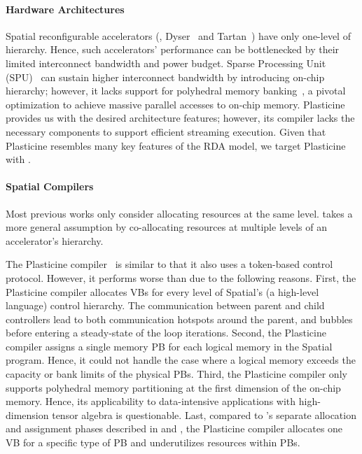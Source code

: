 \paragraph{Hardware Architectures}
Spatial reconfigurable accelerators (\eg, Dyser~\cite{dyser} and Tartan~\cite{tartan}) have only one-level of hierarchy.
Hence, such accelerators' performance can be bottlenecked by their limited interconnect bandwidth and power budget.
Sparse Processing Unit (SPU)~\cite{sparseaccel} can sustain higher interconnect bandwidth by introducing on-chip hierarchy; however, it lacks support for polyhedral memory banking~\cite{poly_cong}, a pivotal optimization to achieve massive parallel accesses to on-chip memory. Plasticine~\cite{plasticine} provides us with the desired architecture features; however, its compiler lacks the necessary components to support efficient streaming execution. Given that Plasticine resembles many key features of the RDA model, we target Plasticine with \name{}.

\paragraph{Spatial Compilers}
Most previous works \cite{nowatzki, spatial-computation} only consider allocating resources at the same level. \name{} takes a more general assumption by co-allocating resources at multiple levels of an accelerator's hierarchy.

The Plasticine compiler~\cite{plasticine} is similar to \name{} that it also uses a token-based control protocol.
However, it performs worse than \name{} due to the following reasons.
First, the Plasticine compiler allocates VBs for every level of Spatial's (a high-level language) control hierarchy. 
The communication between parent and child controllers lead to both communication hotspots around the parent, and bubbles before entering a steady-state of the loop iterations. 
Second, the Plasticine compiler assigns a single memory PB for each logical memory in the Spatial program. 
Hence, it could not handle the case where a logical memory exceeds the capacity or bank limits of the physical PBs.
Third, the Plasticine compiler only supports polyhedral memory partitioning at the first dimension of the on-chip memory. 
Hence, its applicability to data-intensive applications with high-dimension tensor algebra is questionable.
Last, compared to \name{}'s separate allocation and assignment phases described in  and ,
the Plasticine compiler allocates one VB for a specific type of PB and underutilizes resources within PBs.


